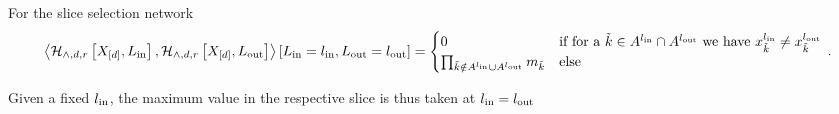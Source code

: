 \begin{example}
	
	For the slice selection network
	\begin{align*}
		\left\langle \mathcal{H}_{\land,d,r}\left[X_{[d]},L_{\mathrm{in}}\right],\mathcal{H}_{\land,d,r}\left[X_{[d]},L_{\mathrm{out}}\right]\right\rangle \left[ L_{\mathrm{in}}=l_{\mathrm{in}},L_{\mathrm{out}}=l_{\mathrm{out}} \right]
		= \begin{cases}
			0 & \text{if for a }\tilde{k}\in A^{l_{\mathrm{in}}}\cap A^{l_{\mathrm{out}}}\text{ we have }x_{\tilde{k}}^{l_{\mathrm{in}}}\neq x_{\tilde{k}}^{l_{\mathrm{out}}} \\
			\prod_{\tilde{k}\notin A^{l_{\mathrm{in}}}\cup A^{l_{\mathrm{out}}}} m_{\tilde{k}}& \text{else} 
		\end{cases} \, . 
	\end{align*}

	Given a fixed $l_{\mathrm{in}}$, the maximum value in the respective slice is thus taken at $l_{\mathrm{in}}=l_{\mathrm{out}}$
\end{example}







